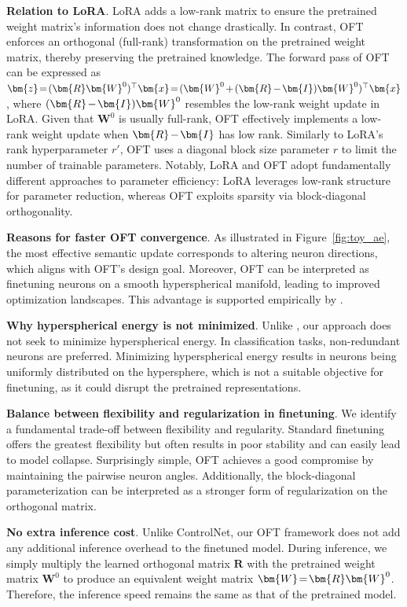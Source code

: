 \textbf{Relation to LoRA}. LoRA adds a low-rank matrix to ensure the pretrained weight matrix's information does not change drastically. In contrast, OFT enforces an orthogonal (full-rank) transformation on the pretrained weight matrix, thereby preserving the pretrained knowledge. The forward pass of OFT can be expressed as $\thickmuskip=2mu \medmuskip=2mu \bm{z}=(\bm{R}\bm{W}^0)^\top\bm{x}=(\bm{W}^0+(\bm{R}-\bm{I})\bm{W}^0)^\top\bm{x}$, where $\thickmuskip=2mu \medmuskip=2mu (\bm{R}-\bm{I})\bm{W}^0$ resembles the low-rank weight update in LoRA. Given that $\bm{W}^0$ is usually full-rank, OFT effectively implements a low-rank weight update when $\thickmuskip=2mu \medmuskip=2mu \bm{R}-\bm{I}$ has low rank. Similarly to LoRA’s rank hyperparameter $r'$, OFT uses a diagonal block size parameter $r$ to limit the number of trainable parameters. Notably, LoRA and OFT adopt fundamentally different approaches to parameter efficiency: LoRA leverages low-rank structure for parameter reduction, whereas OFT exploits sparsity via block-diagonal orthogonality.

\textbf{Reasons for faster OFT convergence}. As illustrated in Figure~\ref{fig:toy_ae}, the most effective semantic update corresponds to altering neuron directions, which aligns with OFT’s design goal. Moreover, OFT can be interpreted as finetuning neurons on a smooth hyperspherical manifold, leading to improved optimization landscapes. This advantage is supported empirically by \cite{liu2021orthogonal}.

\textbf{Why hyperspherical energy is not minimized}. Unlike \cite{liu2021orthogonal}, our approach does not seek to minimize hyperspherical energy. In classification tasks, non-redundant neurons are preferred. Minimizing hyperspherical energy results in neurons being uniformly distributed on the hypersphere, which is not a suitable objective for finetuning, as it could disrupt the pretrained representations.

\textbf{Balance between flexibility and regularization in finetuning}. We identify a fundamental trade-off between flexibility and regularity. Standard finetuning offers the greatest flexibility but often results in poor stability and can easily lead to model collapse. Surprisingly simple, OFT achieves a good compromise by maintaining the pairwise neuron angles. Additionally, the block-diagonal parameterization can be interpreted as a stronger form of regularization on the orthogonal matrix.

\textbf{No extra inference cost}. Unlike ControlNet, our OFT framework does not add any additional inference overhead to the finetuned model. During inference, we simply multiply the learned orthogonal matrix $\bm{R}$ with the pretrained weight matrix $\bm{W}^0$ to produce an equivalent weight matrix $\thickmuskip=2mu \medmuskip=2mu \bm{W}=\bm{R}\bm{W}^0$. Therefore, the inference speed remains the same as that of the pretrained model.

